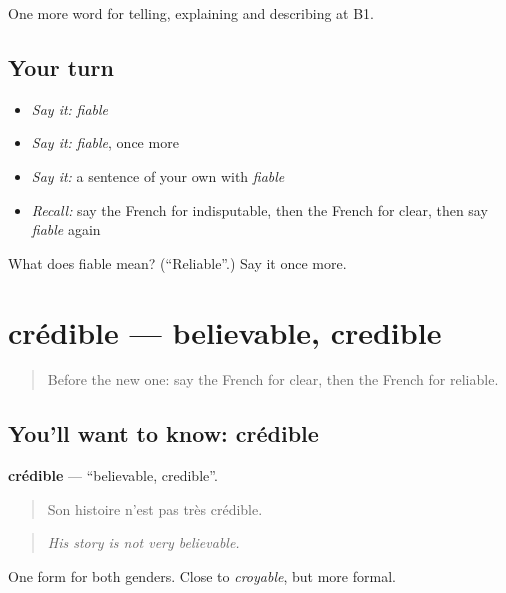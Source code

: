 \begin{grammarlens}[title={What you've built}]
One more word for telling, explaining and describing at B1.
\end{grammarlens}

\subsection*{Your turn}
\begin{itemize}
\raggedright
  \item \emph{Say it:} \emph{fiable}
  \item \emph{Say it:} \emph{fiable}, once more
  \item \emph{Say it:} a sentence of your own with \emph{fiable}
  \item \emph{Recall:} say the French for indisputable, then the French for clear, then say \emph{fiable} again
\end{itemize}

\begin{tcolorbox}[breakable,colback=teal!4,colframe=teal!35!black,title={Before you move on}]
What does fiable mean? (\textquotedblleft{}Reliable\textquotedblright{}.) Say it once more.
\end{tcolorbox}
\section[crédible]{crédible — believable, credible}

\label{lesson:FR-C340-credible}



\begin{quote}
Before the new one: say the French for clear, then the French for reliable.
\end{quote}

\subsection*{You'll want to know: crédible}
\textbf{crédible} — \textquotedblleft{}believable, credible\textquotedblright{}.

\begin{quote}
Son histoire n'est pas très crédible.
\end{quote}

\begin{quote}
\emph{His story is not very believable.}
\end{quote}

One form for both genders. Close to \emph{croyable}, but more formal.

